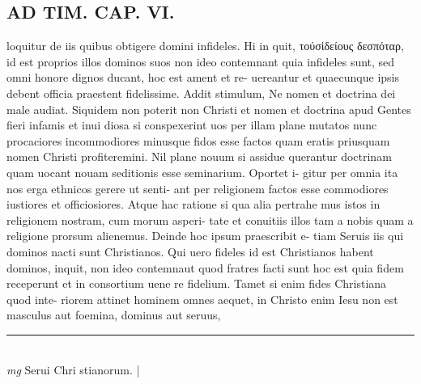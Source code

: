 \documentclass{article}
\begin{document}
\begin{pages}
\section*{AD TIM. CAP. VI. }
\marginpar{[ p.163 ]}\pstart loquitur de iis quibus obtigere domini infideles. Hi in quit, τούσἰδείους δεσπόταρ, id est proprios illos dominos suos non ideo contemnant quia infideles sunt, sed omni honore dignos ducant, hoc est ament et re- uereantur et quaecunque ipsis debent officia praestent fidelissime. Addit stimulum, Ne nomen et doctrina dei male audiat. Siquidem non poterit non Christi et nomen et doctrina apud Gentes fieri infamis et inui diosa si conspexerint uos per illam plane mutatos nunc procaciores incommodiores minusque fidos esse factos quam eratis priusquam nomen Christi profiteremini. Nil plane nouum si assidue querantur doctrinam quam uocant nouam seditionis esse seminarium. Oportet i- gitur per omnia ita nos erga ethnicos gerere ut senti- ant per religionem factos esse commodiores iustiores et officiosiores. Atque hac ratione si qua alia pertrahe mus istos in religionem nostram, cum morum asperi- tate et conuitiis illos tam a nobis quam a religione prorsum alienemus. Deinde hoc ipsum praescribit e- tiam Seruis iis qui dominos nacti sunt Christianos. Qui uero fideles id est Christianos habent dominos, inquit, non ideo contemnaut quod fratres facti sunt hoc est quia fidem receperunt et in consortium uene re fidelium. Tamet si enim fides Christiana quod inte- riorem attinet hominem omnes aequet, in Christo enim Iesu non est masculus aut foemina, dominus aut seruus,  \pend
\vspace{0.5cm}\noindent
\vspace{0.2cm}\rule{1cm}{0.2pt}\\ 
\hspace{0.2cm}\textit{mg}
\footnotesize Serui Chri stianorum. 
\normalsize| 

\end{pages}
\end{document}
